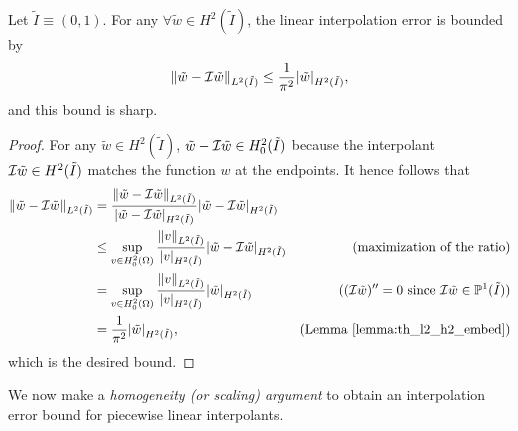 \begin{proposition}
  \label{prop:th_lin_interp_L2_ref}
  Let $\tilde I \equiv (0,1)$.  For any $\forall \tilde w \in H^2(\tilde I)$, the linear interpolation error is bounded by 
  \begin{equation*}
    \| \tilde w - \mathcal{I} \tilde w \|_{L^2(\tilde I)}
    \leq \frac{1}{\pi^2} | \tilde w |_{H^2(\tilde I)},
  \end{equation*}
  and this bound is sharp.
  \begin{proof}
    For any $\tilde w \in H^2(\tilde I)$, $\tilde w - \mathcal{I} \tilde w \in H^2_0(\tilde I)$ because the interpolant $\mathcal{I} \tilde w \in H^2(\tilde I)$ matches the function $w$ at the endpoints. It hence follows that
    \begin{align*}
      \| \tilde w - \mathcal{I} \tilde w \|_{L^2(\tilde I)}
      &=
      \frac{\| \tilde w - \mathcal{I} \tilde w \|_{L^2(\tilde I)}}{| \tilde w - \mathcal{I} \tilde w |_{H^2(\tilde I)}} | \tilde w - \mathcal{I} \tilde w |_{H^2(\tilde I)}
      \\
      &\leq \sup_{v \in H^2_0(\Omega)} \frac{\| v \|_{L^2(\tilde I)}}{| v |_{H^2(\tilde I)}} | \tilde w - \mathcal{I} \tilde w |_{H^2(\tilde I)}
      & \text{(maximization of the ratio)}\\
      &= \sup_{v \in H^2_0(\Omega)} \frac{\| v \|_{L^2(\tilde I)}}{| v |_{H^2(\tilde I)}} | \tilde w |_{H^2(\tilde I)}
      & \text{($(\mathcal{I} \tilde w)'' = 0$ since $\mathcal{I} \tilde w \in \mathbb{P}^1(\tilde I)$)} \\
      &= \frac{1}{\pi^2} | \tilde w |_{H^2(\tilde I)},
      & \text{(Lemma~\ref{lemma:th_l2_h2_embed})}
    \end{align*}
    which is the desired bound.
  \end{proof}
\end{proposition}
We now make a \emph{homogeneity (or scaling) argument} to obtain an interpolation error bound for piecewise linear interpolants. %

